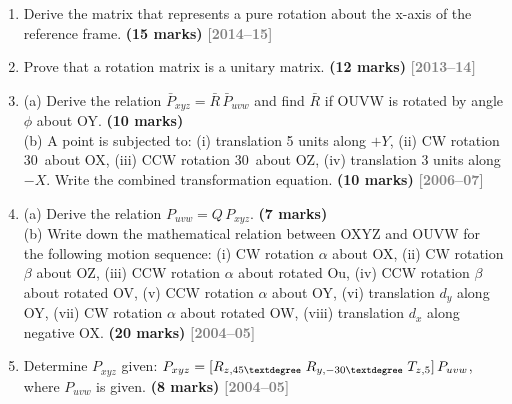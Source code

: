 \documentclass[12pt,a3paper]{article}
\newcommand{\yr}[1]{\hfill\textcolor{gray}{\small\textbf{[#1]}}}
\newcommand{\mk}[1]{\textcolor{orange!70!black}{\small\textbf{(#1 marks)}}}
\begin{document}
\begin{enumerate}
\item \label{qlabel:C2-Q7}
Derive the matrix that represents a pure rotation about the x-axis of
the reference frame. \mk{15}
\yr{2014--15}




\item \label{qlabel:C2-Q6}
Prove that a rotation matrix is a unitary matrix. \mk{12}
\yr{2013--14}




\item \label{qlabel:C2-Q8}
(a) Derive the relation $\bar{P}_{xyz} = \bar{R}\,\bar{P}_{uvw}$ and
find $\bar{R}$ if OUVW is rotated by angle $\phi$ about OY. \mk{10}\\
(b) A point is subjected to: (i) translation 5 units along $+Y$,
(ii) CW rotation 30\textdegree\ about OX, (iii) CCW rotation
30\textdegree\ about OZ, (iv) translation 3 units along $-X$. Write
the combined transformation equation. \mk{10}
\yr{2006--07}




\item \label{qlabel:C2-Q10}
(a) Derive the relation $P_{uvw} = Q\,P_{xyz}$. \mk{7}\\
(b) Write down the mathematical relation between OXYZ and OUVW for the
following motion sequence: (i) CW rotation $\alpha$ about OX, (ii) CW
rotation $\beta$ about OZ, (iii) CCW rotation $\alpha$ about rotated
Ou, (iv) CCW rotation $\beta$ about rotated OV, (v) CCW rotation
$\alpha$ about OY, (vi) translation $d_y$ along OY, (vii) CW rotation
$\alpha$ about rotated OW, (viii) translation $d_x$ along negative
OX. \mk{20}
\yr{2004--05}




\item \label{qlabel:C2-Q11}
Determine $P_{xyz}$ given:
$P_{xyz} = [R_{z,45\textdegree}\;R_{y,-30\textdegree}\;T_{z,5}]\,P_{uvw}$,
where $P_{uvw}$ is given. \mk{8}
\yr{2004--05}





\end{enumerate}
\end{document}
